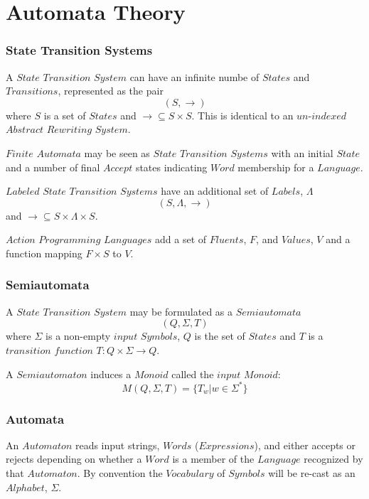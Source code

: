 \documentclass{article}
\begin{document}
\part{Automata Theory}

\section{State Transition Systems}
A $State$ $Transition$ $System$ can have an infinite numbe of $States$
and $Transitions$, represented as the pair
\[
    (S,\rightarrow)
\]
where $S$ is a set of $States$ and $\rightarrow \subseteq S \times
S$. This is identical to an $un$-$indexed$ $Abstract$ $Rewriting$
$System$.

$Finite$ $Automata$ may be seen as $State$ $Transition$ $Systems$ with
an initial $State$ and a number of final $Accept$ states indicating
$Word$ membership for a $Language$.

$Labeled$ $State$ $Transition$ $Systems$ have an additional set of
$Labels$, $\Lambda$
\[(S,\Lambda,\rightarrow)\]
and $\rightarrow \subseteq S \times \Lambda \times S$.

$Action$ $Programming$ $Languages$ add a set of $Fluents$, $F$, and
$Values$, $V$ and a function mapping $F \times S$ to $V$.

\section{Semiautomata}
A $State$ $Transition$ $System$ may be formulated as a $Semiautomata$
\[
    (Q,\Sigma,T)
\]
where $\Sigma$ is a non-empty $input$ $Symbols$, $Q$ is the set of
$States$ and $T$ is a $transition$ $function$ $T:Q \times \Sigma
\rightarrow Q$.

A $Semiautomaton$ induces a $Monoid$ called the $input$ $Monoid$:
\[
    M(Q,\Sigma,T) = \{T_w | w \in \Sigma^*\}
\]

\section{Automata}
\label{subsec:automata}

An $Automaton$ reads input strings, $Words$ ($Expressions$), and
either accepts or rejects depending on whether a $Word$ is a member of
the $Language$ recognized by that $Automaton$. By convention the
$Vocabulary$ of $Symbols$ will be re-cast as an $Alphabet$, $\Sigma$.
\end{document}
